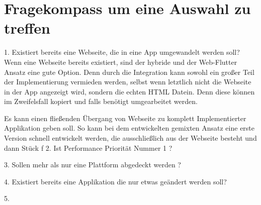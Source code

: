 \section{Fragekompass um eine Auswahl zu treffen}
1. Existiert bereits eine Webseite, die in eine App umgewandelt werden soll?
    Wenn eine Webseite bereits existiert, sind der hybride und der Web-Flutter Ansatz eine gute Option. Denn durch die Integration kann sowohl ein großer Teil der Implementierung vermieden werden, selbst wenn letztlich nicht die Webseite in der App angezeigt wird, sondern die echten HTML Datein. Denn diese können im Zweifelsfall kopiert und falls benötigt umgearbeitet werden.
    
    Es kann einen fließenden Übergang von Webseite zu komplett Implementierter Applikation geben soll. So kann bei dem entwickelten gemixten Ansatz eine erste Version schnell entwickelt werden, die ausschließlich aus der Webseite besteht und dann Stück f
2. Ist Performance Priorität Nummer 1 ?

3. Sollen mehr als nur eine Plattform abgedeckt werden ?

4. Existiert bereits eine Applikation die nur etwas geändert werden soll?

5. 

